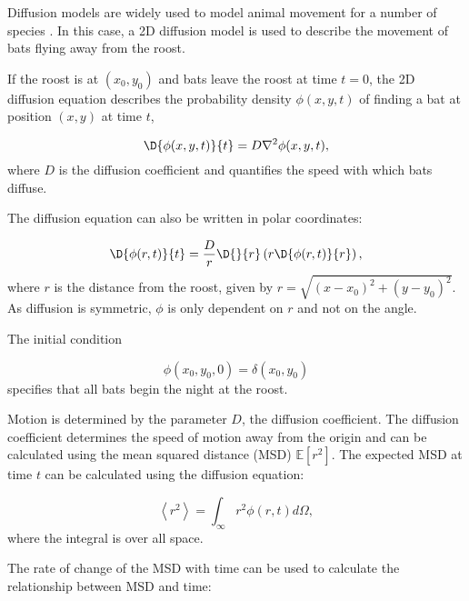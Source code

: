 Diffusion models are widely used to model animal movement for a number of species \cite{Ovaskainen2016}. In this case, a 2D diffusion model is used to describe the movement of bats flying away from the roost.

If the roost is at $(x_0,y_0)$ and bats leave the roost at time $t =0$,
the 2D diffusion equation describes the probability density $\phi(x,y,t)$ of
finding a bat at position $(x,y)$ at time $t$,

\begin{equation}
  \D{\phi(x,y,t)}{ t} = D \nabla^2 \phi(x,y,t) ,
  \nonumber
\end{equation}
%
where $D$ is the diffusion coefficient and quantifies the speed with which bats diffuse.

The diffusion equation can also be written in polar coordinates:

\begin{equation}
\D{ \phi(r,t)}{t} = \frac{D}{r} \D{}{ r} \left( r \D{\phi(r,t)}{r} \right),
\end{equation}
%
where $r$ is the distance from the roost, given by $r=\sqrt{(x-x_0)^2 + (y-y_0)^2}$. As diffusion is symmetric, $\phi$ is only dependent on $r$ and not on the angle.

The initial condition

\begin{equation}
\phi(x_0,y_0,0) = \delta(x_0,y_0)
\label{eqn:IC}
\end{equation}
%
specifies that all bats begin the night at the roost.

Motion is determined by the parameter $D$, the diffusion coefficient. The diffusion coefficient determines the speed of motion away from the origin and can be calculated using the mean squared distance (MSD) $\mathbb{E}[r^2]$. The expected MSD at time $t$ can be calculated using the diffusion equation:

\begin{equation}
\left<r^2\right> = \int_{\infty}r^2 \phi(r,t) d\Omega ,
\end{equation}
%
where the integral is over all space.

The rate of change of the MSD with time can be used to calculate the relationship between MSD and time:

